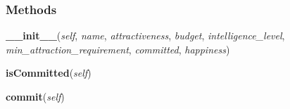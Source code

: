 
  \subsubsection{Methods}

    \label{boy:Boy:__init__}

    \vspace{0.5ex}

\hspace{.8\funcindent}\begin{boxedminipage}{\funcwidth}

    \raggedright \textbf{\_\_init\_\_}(\textit{self}, \textit{name}, \textit{attractiveness}, \textit{budget}, \textit{intelligence\_level}, \textit{min\_attraction\_requirement}, \textit{committed}, \textit{happiness})

\setlength{\parskip}{2ex}
\setlength{\parskip}{1ex}
    \end{boxedminipage}

    \label{boy:Boy:isCommitted}

    \vspace{0.5ex}

\hspace{.8\funcindent}\begin{boxedminipage}{\funcwidth}

    \raggedright \textbf{isCommitted}(\textit{self})

\setlength{\parskip}{2ex}
\setlength{\parskip}{1ex}
    \end{boxedminipage}

    \label{boy:Boy:commit}

    \vspace{0.5ex}

\hspace{.8\funcindent}\begin{boxedminipage}{\funcwidth}

    \raggedright \textbf{commit}(\textit{self})

\setlength{\parskip}{2ex}
\setlength{\parskip}{1ex}
    \end{boxedminipage}

